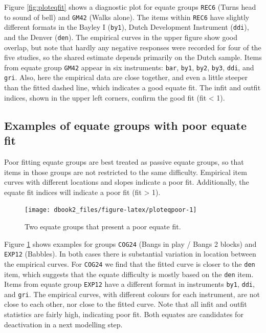 \documentclass[
]{book}
\begin{document}
Figure \ref{fig:ploteqfit} shows a diagnostic plot for equate groups \texttt{REC6} (Turns head to sound of bell) and \texttt{GM42} (Walks alone). The items within \texttt{REC6} have slightly different formats in the Bayley I (\texttt{by1}), Dutch Development Instrument (\texttt{ddi}), and the Denver (\texttt{den}). The empirical curves in the upper figure show good overlap, but note that hardly any negative responses were recorded for four of the five studies, so the shared estimate depends primarily on the Dutch sample. Items from equate group \texttt{GM42} appear in six instruments: \texttt{bar}, \texttt{by1}, \texttt{by2}, \texttt{by3}, \texttt{ddi}, and \texttt{gri}. Also, here the empirical data are close together, and even a little steeper than the fitted dashed line, which indicates a good equate fit. The infit and outfit indices, shown in the upper left corners, confirm the good fit (fit \textless{} 1).

\hypertarget{examples-of-equate-groups-with-poor-equate-fit}{%
\subsection{Examples of equate groups with poor equate fit}\label{examples-of-equate-groups-with-poor-equate-fit}}

Poor fitting equate groups are best treated as passive equate groups, so that items in those groups are not restricted to the same difficulty. Empirical item curves with different locations and slopes indicate a poor fit. Additionally, the equate fit indices will indicate a poor fit (fit \textgreater{} 1).

\begin{figure}

{\centering \texttt{[image: dbook2\_files/figure-latex/ploteqpoor-1]} 

}

\caption{Two equate groups that present a poor equate fit.}\label{fig:ploteqpoor}
\end{figure}



Figure \ref{fig:ploteqpoor} shows examples for groups \texttt{COG24} (Bangs in play / Bangs 2 blocks) and \texttt{EXP12} (Babbles). In both cases there is substantial variation in location between the empirical curves. For \texttt{COG24} we find that the fitted curve is closer to the \texttt{den} item, which suggests that the equate difficulty is mostly based on the \texttt{den} item. Items from equate group \texttt{EXP12} have a different format in instruments \texttt{by1}, \texttt{ddi}, and \texttt{gri}. The empirical curves, with different colours for each instrument, are not close to each other, nor close to the fitted curve. Note that all infit and outfit statistics are fairly high, indicating poor fit. Both equates are candidates for deactivation in a next modelling step.
\end{document}
